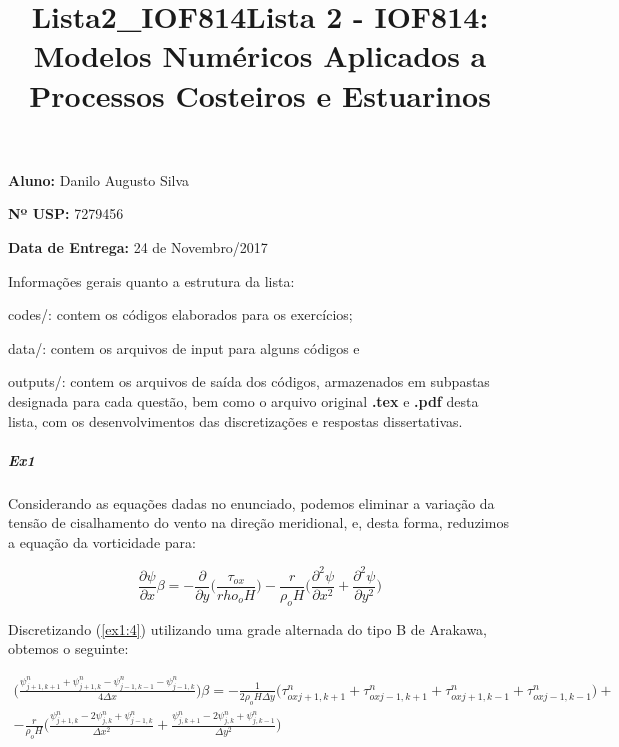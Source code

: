 \documentclass[11pt]{article}
\title{Lista2\_IOF814}
\begin{document}
    \title{Lista 2 - IOF814: Modelos Numéricos Aplicados a Processos Costeiros e Estuarinos}
    \maketitle

    \begin{center}
    \textbf{Aluno:} Danilo Augusto Silva

    \textbf{Nº USP:} 7279456

    \textbf{Data de Entrega:} 24 de Novembro/2017
    \end{center}
    \vspace{0.5in}
    Informações gerais quanto a estrutura da lista:

    codes/: contem os códigos elaborados para os exercícios;

    data/: contem os arquivos de input para alguns códigos e

    outputs/: contem os arquivos de saída dos códigos, armazenados em
    subpastas designada para cada questão, bem como o arquivo original \textbf{.tex}
    e \textbf{.pdf} desta lista, com os desenvolvimentos das discretizações e
    respostas dissertativas.

    \subparagraph{Ex1}

    Considerando as equações dadas no enunciado, podemos eliminar a variação
da tensão de cisalhamento do vento na direção meridional, e, desta
forma, reduzimos a equação da vorticidade para:

\begin{equation}
    \frac{\partial{\psi}}{\partial{x}}\beta = - \frac{\partial}{\partial{y}}\bigg( \frac{\tau_ {ox}}{rho_oH} \bigg)- \frac{r}{\rho_oH}\bigg( \frac{\partial^2{\psi}}{\partial{x^2}} + \frac{\partial^2{\psi}}{\partial{y^2}} \bigg)
    \label{ex1:4}
\end{equation}

\bigskip
Discretizando (\ref{ex1:4}) utilizando uma grade alternada do tipo B de Arakawa,
obtemos o seguinte:

\begin{equation}
\begin{aligned}
\bigg( \frac{\psi^{n}_{j+1,k+1} + \psi^{n}_{j+1,k} - \psi^{n}_{j-1,k-1} - \psi^{n}_{j-1,k}}{4\Delta{x}} \bigg)\beta = -\frac{1}{2\rho_oH\Delta{y}}\bigg( \tau^{n}_{ox j+1,k+1} + \tau^{n}_{ox j-1,k+1} + \tau^{n}_{ox j+1,k-1} + \tau^{n}_{ox j-1,k-1}\bigg) + \\
- \frac{r}{\rho_oH}\bigg(
  \frac{\psi^{n}_{j+1,k} - 2\psi^{n}_{j,k} + \psi^{n}_{j-1,k}}{\Delta{x^2}}
+ \frac{\psi^{n}_{j,k+1} - 2\psi^{n}_{j,k} + \psi^{n}_{j,k-1}}{\Delta{y^2}} \bigg)
\label{ex1:5}
\end{aligned}
\end{equation}
\end{document}
